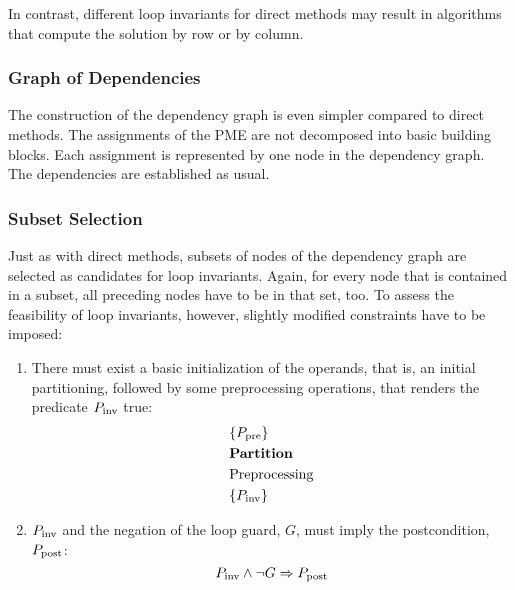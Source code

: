 In contrast, different loop invariants for direct methods may result in algorithms that compute the solution by row or by column. 



\subsubsection{Graph of Dependencies}

The construction of the dependency graph is even simpler compared to direct methods. The assignments of the PME are not decomposed into basic building blocks. Each assignment is represented by one node in the dependency graph. The dependencies are established as usual.

\subsubsection{Subset Selection}

Just as with direct methods, subsets of nodes of the dependency graph are selected as candidates for loop invariants. Again, for every node that is contained in a subset, all preceding nodes have to be in that set, too. To assess the feasibility of loop invariants, however, slightly modified constraints have to be imposed:
%
\begin{enumerate}
\item There must exist a basic initialization of the operands, that is, an initial partitioning, followed by some preprocessing operations, that renders the predicate $P_\text{\textrm{inv}}$ true:
\begin{align*}
&\{P_\text{\textrm{pre}}\} \\
&\text{\textbf{Partition}} \\
&\text{Preprocessing} \\
&\{P_\text{\textrm{inv}}\}
\end{align*}
\item $P_\text{\textrm{inv}}$ and the negation of the loop guard, $G$, must imply the postcondition, $P_\text{\textrm{post}}$:
$$P_\text{\textrm{inv}} \land \neg G \Rightarrow P_\text{\textrm{post}}$$
\end{enumerate}
%


